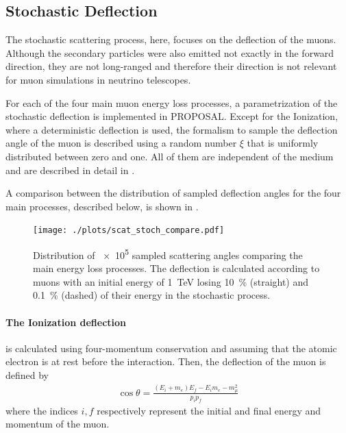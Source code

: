 \subsection{Stochastic Deflection} \label{sec:stochastic_deflect}

The stochastic scattering process, here, focuses on the deflection of the muons.
Although the secondary particles were also emitted not exactly in the forward direction, they are not long-ranged and therefore their direction is not relevant for muon simulations in neutrino telescopes.

For each of the four main muon energy loss processes, a parametrization of the stochastic deflection is implemented in PROPOSAL.
Except for the Ionization, where a deterministic deflection is used, the formalism to sample the deflection angle of the muon is described using a random number $\xi$ that is uniformly distributed between zero and one.
All of them are independent of the medium and are described in detail in \cite{Gutjahr21Master}.

A comparison between the distribution of sampled deflection angles for the four main processes, described below, is shown in .
\begin{figure}
    \centering
    \texttt{[image: ./plots/scat\_stoch\_compare.pdf]}
    \caption{Distribution of \num{e5} sampled scattering angles comparing the main energy loss processes.
    The deflection is calculated according to muons with an initial energy of \SI{1}{TeV} losing \SI{10}{\%} (straight) and \SI{0.1}{\%} (dashed) of their energy in the stochastic process.}
    \label{fig:scat_stoch_compare}
\end{figure}

\paragraph{The Ionization deflection} is calculated  using four-momentum conservation and assuming that the atomic electron is at rest before the interaction.
Then, the deflection of the muon is defined by \cite{Gutjahr21Master}
\begin{align}
    \cos \theta = \frac{(E_i + m_e)E_f - E_i m_e - m_\mu^2}{p_i p_f}
\end{align}
where the indices $i,f$ respectively represent the initial and final energy and momentum of the muon.

